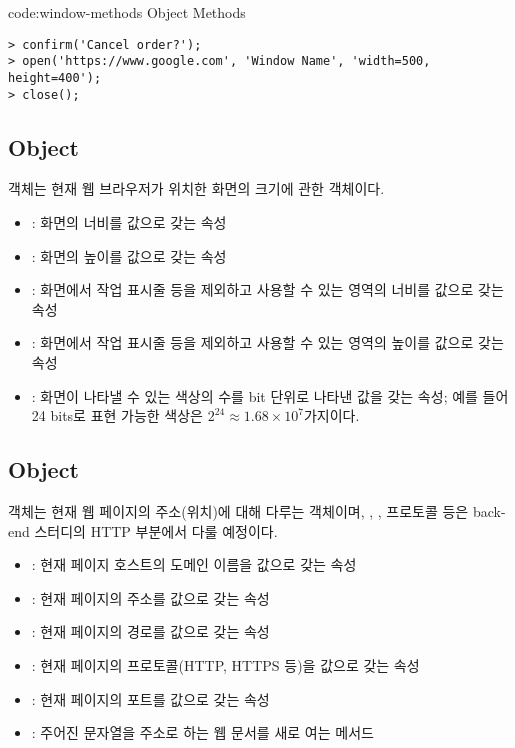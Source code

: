\begin{codeenv}{code:window-methods}{ Object Methods}\begin{verbatim}
> confirm('Cancel order?');
> open('https://www.google.com', 'Window Name', 'width=500, height=400');
> close();
\end{verbatim}
\end{codeenv}
\clearpage

\subsection*{ Object}

 객체는 현재 웹 브라우저가 위치한 화면의 크기에 관한 객체이다.

\begin{itemize}
    \item {}: 화면의 너비를 값으로 갖는 속성
    \item {}: 화면의 높이를 값으로 갖는 속성
    \item {}: 화면에서 작업 표시줄 등을 제외하고 사용할 수 있는 영역의 너비를 값으로 갖는 속성
    \item {}: 화면에서 작업 표시줄 등을 제외하고 사용할 수 있는 영역의 높이를 값으로 갖는 속성
    \item {}: 화면이 나타낼 수 있는 색상의 수를 bit 단위로 나타낸 값을 갖는 속성; 예를 들어 24 bits로 표현 가능한 색상은 $2^{24} \approx 1.68 \times 10^7$가지이다.
\end{itemize}

\subsection*{ Object}

 객체는 현재 웹 페이지의 주소(위치)에 대해 다루는 객체이며, , , 프로토콜 등은 back-end 스터디의 HTTP 부분에서 다룰 예정이다.

\begin{itemize}
    \item {}: 현재 페이지 호스트의 도메인 이름을 값으로 갖는 속성
    \item {}: 현재 페이지의 주소를 값으로 갖는 속성
    \item {}: 현재 페이지의 경로를 값으로 갖는 속성
    \item {}: 현재 페이지의 프로토콜(HTTP, HTTPS 등)을 값으로 갖는 속성
    \item {}: 현재 페이지의 포트를 값으로 갖는 속성
    \item {}: 주어진 문자열을 주소로 하는 웹 문서를 새로 여는 메서드
\end{itemize}

